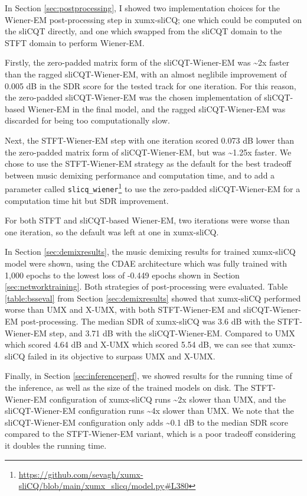 \documentclass[report.tex]{subfiles}
\begin{document}
In Section \ref{sec:postprocessing}, I showed two implementation choices for the Wiener-EM post-processing step in xumx-sliCQ; one which could be computed on the sliCQT directly, and one which swapped from the sliCQT domain to the STFT domain to perform Wiener-EM.

Firstly, the zero-padded matrix form of the sliCQT-Wiener-EM was \textasciitilde2x faster than the ragged sliCQT-Wiener-EM, with an almost neglibile improvement of 0.005 dB in the SDR score for the tested track for one iteration. For this reason, the zero-padded sliCQT-Wiener-EM was the chosen implementation of sliCQT-based Wiener-EM in the final model, and the ragged sliCQT-Wiener-EM was discarded for being too computationally slow.

Next, the STFT-Wiener-EM step with one iteration scored 0.073 dB lower than the zero-padded matrix form of sliCQT-Wiener-EM, but was \textasciitilde1.25x faster. We chose to use the STFT-Wiener-EM strategy as the default for the best tradeoff between music demixing performance and computation time, and to add a parameter called \Verb#slicq_wiener#\footnote{\url{https://github.com/sevagh/xumx-sliCQ/blob/main/xumx_slicq/model.py\#L380}} to use the zero-padded sliCQT-Wiener-EM for a computation time hit but SDR improvement.

For both STFT and sliCQT-based Wiener-EM, two iterations were worse than one iteration, so the default was left at one in xumx-sliCQ.

In Section \ref{sec:demixresults}, the music demixing results for trained xumx-sliCQ model were shown, using the CDAE architecture which was fully trained with 1,000 epochs to the lowest loss of -0.449 epochs shown in Section \ref{sec:networktraining}. Both strategies of post-processing were evaluated. Table \ref{table:bsseval} from Section \ref{sec:demixresults} showed that xumx-sliCQ performed worse than UMX and X-UMX, with both STFT-Wiener-EM and sliCQT-Wiener-EM post-processing. The median SDR of xumx-sliCQ was 3.6 dB with the STFT-Wiener-EM step, and 3.71 dB with the sliCQT-Wiener-EM. Compared to UMX which scored 4.64 dB and X-UMX which scored 5.54 dB, we can see that xumx-sliCQ failed in its objective to surpass UMX and X-UMX.

Finally, in Section \ref{sec:inferenceperf}, we showed results for the running time of the inference, as well as the size of the trained models on disk. The STFT-Wiener-EM configuration of xumx-sliCQ runs \textasciitilde2x slower than UMX, and the sliCQT-Wiener-EM configuration runs \textasciitilde4x slower than UMX. We note that the sliCQT-Wiener-EM configuration only adds \textasciitilde0.1 dB to the median SDR score compared to the STFT-Wiener-EM variant, which is a poor tradeoff considering it doubles the running time.
\end{document}
